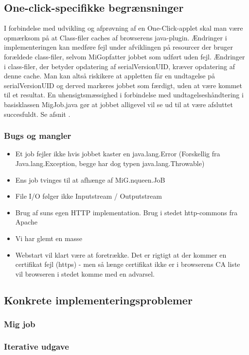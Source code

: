 \documentclass[draft,a4paper,10pt]{article}
\newcommand{\mig}{MiG}
\newcommand{\oc}{One-Click}
\begin{document}
\subsection{One-click-specifikke begrænsninger}

I forbindelse med udvikling og afprøvning af en \oc-applet skal man være opmærksom på at Class-filer caches af browserens java-plugin. Ændringer i implementeringen kan medføre fejl under afviklingen på resourcer der bruger forældede class-filer, selvom \mig opfatter jobbet som udført uden fejl. Ændringer i class-filer, der betyder opdatering af serialVersionUID, kræver opdatering af denne cache. Man kan altså riskikere at appletten får en undtagelse på serialVersionUID og derved markeres jobbet som færdigt, uden at være kommet til et resultat. En uhensigtsmæssighed i forbindelse med undtagelseshåndtering i basisklassen MigJob.java gør at jobbet alligevel vil se ud til at være afsluttet succesfuldt. Se afsnit \cite{bugs}. 


\subsubsection{Bugs og mangler}\label{bugs}
\begin{itemize}
	\item Et job fejler ikke hvis jobbet kaster en java.lang.Error (Forskellig fra Java.lang.Exception, begge har dog typen java.lang.Throwable)
	\item Ens job tvinges til at afhænge af MiG.nqueen.JoB
	\item File I/O følger ikke Inputstream / Outputstream	
	\item Brug af suns egen HTTP implementation. Brug i stedet http-commons fra Apache
	\item Vi har glemt en masse 
	\item Webstart vil klart være at foretrække. Det er rigtigt at der kommer en certifikat fejl (https) - men så længe certifikat ikke er i browserens CA liste vil browseren i stedet komme med en advarsel.
\end{itemize}


\subsection{Konkrete implementeringsproblemer}
\subsubsection{Mig job}\label{label}
\subsubsection{Iterative udgave}
\end{document}
